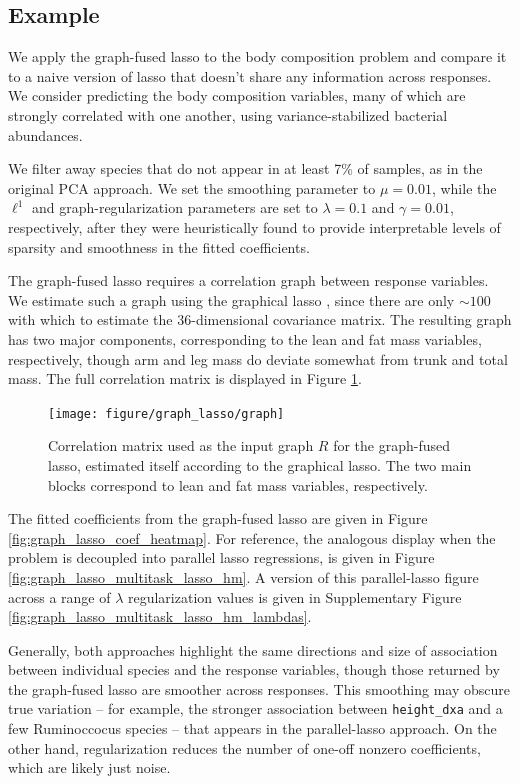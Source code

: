 \documentclass[14pt]{extarticle}
\begin{document}
\subsection{Example}
\label{subsec:graph_fused_example}

We apply the graph-fused lasso to the body composition problem and compare it to
a naive version of lasso that doesn't share any information across responses. We
consider predicting the body composition variables, many of which are strongly
correlated with one another, using variance-stabilized bacterial abundances.

We filter away species that do not appear in at least 7\% of samples, as in the
original PCA approach. We set the smoothing parameter to $\mu = 0.01$, while the
$\ell^{1}$ and graph-regularization parameters are set to $\lambda = 0.1$ and
$\gamma = 0.01$, respectively, after they were heuristically found to provide
interpretable levels of sparsity and smoothness in the fitted coefficients.

The graph-fused lasso requires a correlation graph between response variables.
We estimate such a graph using the graphical lasso \citep{friedman2008sparse},
since there are only $\sim 100$ with which to estimate the 36-dimensional
covariance matrix. The resulting graph has two major components, corresponding
to the lean and fat mass variables, respectively, though arm and leg mass do
deviate somewhat from trunk and total mass. The full correlation matrix is
displayed in Figure \ref{fig:graph_lasso_graph}.

\begin{figure}
  \centering
  \texttt{[image: figure/graph\_lasso/graph]}
  \caption{Correlation matrix used as the input graph $R$ for the graph-fused
    lasso, estimated itself according to the graphical
    lasso. The two main blocks correspond to lean and fat mass variables,
    respectively. \label{fig:graph_lasso_graph} }
\end{figure}

The fitted coefficients from the graph-fused lasso are given in Figure
\ref{fig:graph_lasso_coef_heatmap}. For reference, the analogous display when
the problem is decoupled into parallel lasso regressions, is given in Figure
\ref{fig:graph_lasso_multitask_lasso_hm}. A version of this parallel-lasso
figure across a range of $\lambda$ regularization values is given in
Supplementary Figure \ref{fig:graph_lasso_multitask_lasso_hm_lambdas}.

Generally, both approaches highlight the same directions and size of association
between individual species and the response variables, though those returned by
the graph-fused lasso are smoother across responses. This smoothing may obscure
true variation -- for example, the stronger association between
\texttt{height\_dxa} and a few Ruminoccocus species -- that appears in the
parallel-lasso approach. On the other hand, regularization reduces the number of
one-off nonzero coefficients, which are likely just noise.
\end{document}

